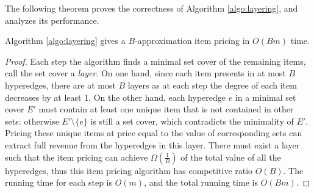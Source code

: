 The following theorem proves the correctness of Algorithm \ref{algo:layering}, and analyzes its performance.

\begin{theorem}
\label{thm-Bapprox}

Algorithm \ref{algo:layering} gives a $B$-approximation item pricing in $O(Bm)$ time. 

\end{theorem}

\begin{proof}
Each step the algorithm finds a minimal set cover of the remaining items, call the set cover a \textit{layer}.
On one hand, since each item presents in at most $B$ hyperedges, there are at most $B$ layers as at each step the degree of each item decreases by at least 1. On the other hand, each hyperedge $e$ in a minimal
set cover $E'$ must contain at least one unique item that is not contained in other sets: otherwise $E'\setminus \{e\}$ is still a set cover,
which contradicts the minimality of $E'$. Pricing these unique items at price equal to the value of corresponding sets can extract full revenue from the hyperedges in this layer. There must exist a layer such that the item pricing can achieve 
$\Omega(\frac{1}{B})$ of the total value of all the hyperedges, thus this item pricing algorithm has competitive ratio $O(B)$. The running time for each step is $O(m)$, and the total running time is $O(Bm)$.

\end{proof}
